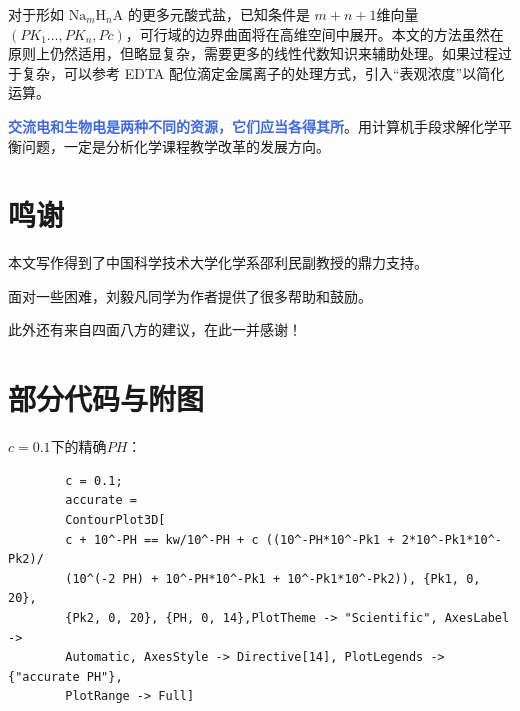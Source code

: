 \documentclass[UTF-8]{ctexart}
\newcommand{\0}{\boldsymbol{0}}
\begin{document}
对于形如 $\text{Na}_m\text{H}_n\text{A}$ 的更多元酸式盐，已知条件是 $m+n+1 $维向量$ (PK_1\dots,PK_n,Pc) $，可行域的边界曲面将在高维空间中展开。本文的方法虽然在原则上仍然适用，但略显复杂，需要更多的线性代数知识来辅助处理。如果过程过于复杂，可以参考 EDTA 配位滴定金属离子的处理方式，引入“表观浓度”以简化运算。

\textcolor{RoyalBlue}{\textbf{交流电和生物电是两种不同的资源，它们应当各得其所}}。用计算机手段求解化学平衡问题，一定是分析化学课程教学改革的发展方向。

\section{鸣谢}
本文写作得到了中国科学技术大学化学系邵利民副教授的鼎力支持。

面对一些困难，刘毅凡同学为作者提供了很多帮助和鼓励。

此外还有来自四面八方的建议，在此一并感谢！

\pagebreak

\section{部分代码与附图}
    $c = 0.1$下的精确$PH$：
    \begin{lstlisting}
        c = 0.1;
        accurate = 
        ContourPlot3D[
        c + 10^-PH == kw/10^-PH + c ((10^-PH*10^-Pk1 + 2*10^-Pk1*10^-Pk2)/
        (10^(-2 PH) + 10^-PH*10^-Pk1 + 10^-Pk1*10^-Pk2)), {Pk1, 0, 20}, 
        {Pk2, 0, 20}, {PH, 0, 14},PlotTheme -> "Scientific", AxesLabel -> 
        Automatic, AxesStyle -> Directive[14], PlotLegends -> {"accurate PH"}, 
        PlotRange -> Full]
    \end{lstlisting}
\end{document}

